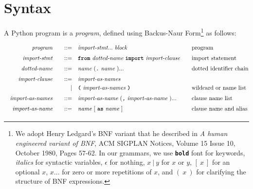 \section{Syntax}

A Python program is a \emph{program}, defined using Backus-Naur Form\footnote{
  We adopt Henry Ledgard's BNF variant that he described in
  \emph{A human engineered variant of BNF}, ACM SIGPLAN Notices,
  Volume 15 Issue 10,
  October 1980, Pages 57-62. In our grammars, we use
  \textbf{\texttt{bold}} font for keywords,
  {\it italics} for syntactic variables, $\epsilon$ for nothing,
  $x\ |\ y$ for $x$ or $y$, $[\ x\ ]$ for an optional $x$,
  $ x ...$ for zero or more repetitions of $x$, and $(\ x\ )$ for
clarifying the structure of BNF expressions.}
as follows:

\begin{alignat*}{9}
&& \textit{program}         && \quad ::= \quad & \textit{import-stmt} ... \ \textit{block}                                                                         && \textrm{program}                          \\[1mm]
&& \textit{import-stmt}     && \quad ::= \quad & \textbf{\texttt{from}}\ \textit{dotted-name} \ \textbf{\texttt{import}}\ \textit{import-clause} \quad             && \textrm{import statement}                 \\[1mm]
&& \textit{dotted-name}     && \quad ::= \quad & \textit{name}\ (\textbf{\texttt{.}} \ \textit{name}\ )...                                                         && \textrm{dotted identifier chain}          \\[1mm]
&& \textit{import-clause}   && \quad ::= \quad & \textit{import-as-names}                                                                                                                                       \\
&&                          &&         | \quad & \textbf{\texttt{(}}\ \textit{import-as-names}\ \textbf{\texttt{)}}                                                && \textrm{wildcard or name list}            \\[1mm]
&& \textit{import-as-names} && \quad ::= \quad & \textit{import-as-name}\ (\textit{\texttt{,}}\ \textit{import-as-name}\ ) ...                                     && \textrm{clause name list}                 \\[1mm]
&& \textit{import-as-name}  && \quad ::= \quad & \textit{name}\ [\ \textbf{\texttt{as}}\ \textit{name}\ ]                                                          && \textrm{clause name and alias}            \\[1mm]

\end{alignat*}
